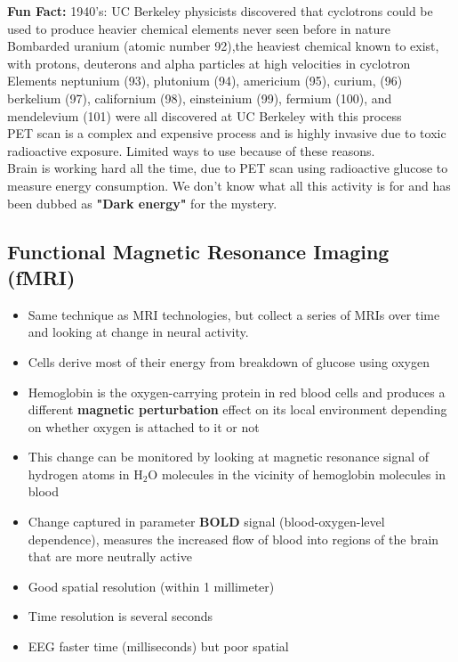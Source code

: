 \documentclass{article}
\begin{document}
\noindent \textbf{Fun Fact:} 1940's: UC Berkeley physicists discovered that cyclotrons could be used to produce heavier chemical elements never seen before in nature \\

Bombarded uranium (atomic number 92),the heaviest chemical known to exist, with protons, deuterons and alpha particles at high velocities in cyclotron\\

Elements neptunium (93), plutonium (94), americium (95), curium, (96) berkelium (97), californium (98), einsteinium (99), fermium (100), and mendelevium (101) were all discovered at UC Berkeley with this process \\

\noindent PET scan is a complex and expensive process and is highly invasive due to toxic radioactive exposure. Limited ways to use because of these reasons. \\

\indent Brain is working hard all the time, due to PET scan using radioactive glucose to measure energy consumption. We don't know what all this activity is for and has been dubbed as \textbf{"Dark energy"} for the mystery. 

\subsection{Functional Magnetic Resonance Imaging (fMRI)}
\begin{itemize}
    \item Same technique as MRI technologies, but collect a series of MRIs over time and looking at change in neural activity. 
    \item Cells derive most of their energy from breakdown of glucose using oxygen
    \item Hemoglobin is the oxygen-carrying protein in red blood cells and produces a different \textbf{magnetic perturbation} effect on its local environment depending on whether oxygen is attached to it or not
    \item This change can be monitored by looking at magnetic resonance signal of hydrogen atoms in H$_2$O molecules in the vicinity of hemoglobin molecules in blood 
    \item Change captured in parameter \textbf{BOLD} signal (blood-oxygen-level dependence), measures the increased flow of blood into regions of the brain that are more neutrally active
    \item Good spatial resolution (within 1 millimeter) 
    \item Time resolution is several seconds
    \item EEG faster time (milliseconds) but poor spatial
\end{itemize}
\end{document}
